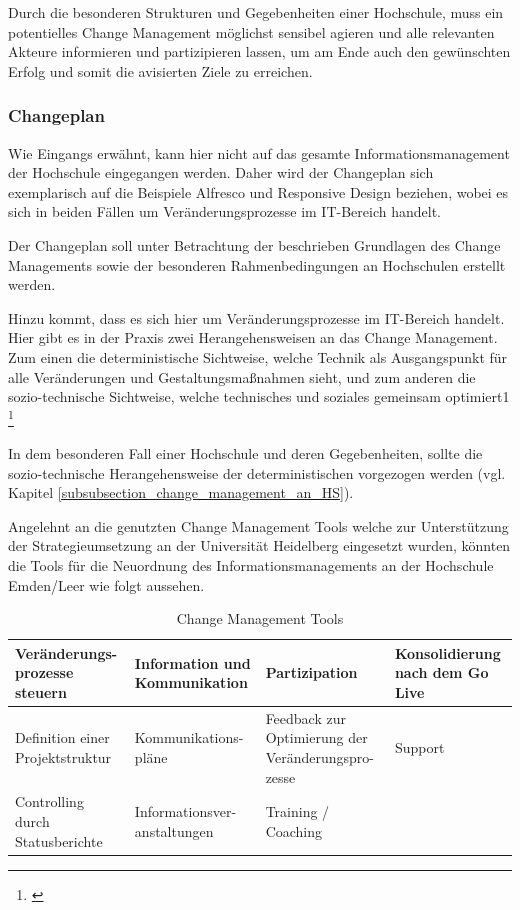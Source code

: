 Durch die besonderen Strukturen und Gegebenheiten einer Hochschule, muss  ein potentielles Change Management möglichst sensibel agieren und alle relevanten Akteure informieren und partizipieren lassen, um am Ende auch den gewünschten Erfolg und somit die avisierten Ziele zu erreichen.

\subsubsection{Changeplan}
Wie Eingangs erwähnt, kann hier nicht auf das gesamte Informationsmanagement der Hochschule eingegangen werden. Daher wird der Changeplan sich exemplarisch auf die Beispiele Alfresco und Responsive Design beziehen, wobei es sich in beiden Fällen um Veränderungsprozesse im IT-Bereich handelt.

Der Changeplan soll unter Betrachtung der beschrieben Grundlagen des Change Managements sowie der besonderen Rahmenbedingungen an Hochschulen erstellt werden.

Hinzu kommt, dass es sich hier um Veränderungsprozesse im IT-Bereich handelt. 
Hier gibt es in der Praxis zwei Herangehensweisen an das Change Management. 
Zum einen die deterministische Sichtweise, welche Technik als Ausgangspunkt für alle Veränderungen und Gestaltungsmaßnahmen sieht, und zum anderen die sozio-technische Sichtweise, welche technisches und soziales gemeinsam optimiert1 \footnote{\cite{feldmuller_change_2007}}

In dem besonderen Fall einer Hochschule und deren Gegebenheiten, sollte die sozio-technische Herangehensweise der deterministischen vorgezogen werden (vgl. Kapitel \ref{subsubsection_change_management_an_HS}).  

Angelehnt an die genutzten Change Management Tools welche zur Unterstützung der Strategieumsetzung an der Universität Heidelberg eingesetzt wurden, könnten die Tools für die Neuordnung des Informationsmanagements an der Hochschule Emden/Leer wie folgt aussehen.

\begin{table}
	\begin{tabularx}{\textwidth}{|X|X|X|X|}
		\hline \textbf{Veränderungs-prozesse steuern} & \textbf{Information und Kommunikation} & \textbf{Partizipation} & \textbf{Konsolidierung nach dem Go Live}\\
		\hline Definition einer Projektstruktur & Kommunikations-pläne & Feedback zur Optimierung der Veränderungspro-zesse & Support\\
		\hline Controlling durch Statusberichte & Informationsver-anstaltungen & Training / Coaching & \\
		\hline
	\end{tabularx}
	\caption{Change Management Tools}
	\label{tab_change_management_tools}
\end{table}

